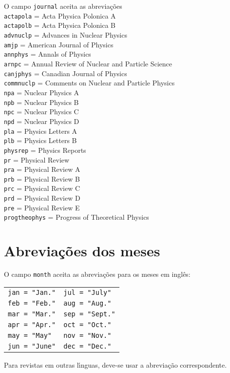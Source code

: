 \documentclass[a4paper,12pt]{article}
\newcommand{\ii}{\'{\i}}
\newcommand{\ca}{\c{c}\~ao}
\newcommand{\co}{\c{c}\~oes}
\newcommand{\identacao}{\\[1mm] \hspace*{3cm}}
\begin{document}
			
			O campo \verb+journal+ aceita as abrevia{\co}
			\identacao
			{\verb+actapola+} = {Acta Physica Polonica A}
			\identacao
			{\verb+actapolb+} = {Acta Physica Polonica B}
			\identacao
			{\verb+advnuclp+} = {Advances in Nuclear Physics}
			\identacao
			{\verb+amjp+} = {American Journal of Physics}
			\identacao
			{\verb+annphys+} = {Annals of Physics}
			\identacao
			{\verb+arnpc+} = {Annual Review of Nuclear and Particle Science}
			\identacao
			{\verb+canjphys+} = {Canadian Journal of Physics}
			\identacao
			{\verb+commnuclp+} = {Comments on Nuclear and Particle Physics}
			\identacao
			{\verb+npa+} = {Nuclear Physics A}
			\identacao
			{\verb+npb+} = {Nuclear Physics B}
			\identacao
			{\verb+npc+} = {Nuclear Physics C}
			\identacao
			{\verb+npd+} = {Nuclear Physics D}
			\identacao
			{\verb+pla+} = {Physics Letters A}
			\identacao
			{\verb+plb+} = {Physics Letters B}
			\identacao
			{\verb+physrep+} = {Physics Reports}
			\identacao
			{\verb+pr+} = {Physical Review}
			\identacao
			{\verb+pra+} = {Physical Review A}
			\identacao
			{\verb+prb+} = {Physical Review B}
			\identacao
			{\verb+prc+} = {Physical Review C}
			\identacao
			{\verb+prd+} = {Physical Review D}
			\identacao
			{\verb+pre+} = {Physical Review E}
			\identacao
			{\verb+progtheophys+} = {Progress of Theoretical Physics}
			\begin{comment}
				\identacao
				{\verb+zfpa+} = {Zeitschrift f\"ur Physik A}
				\identacao
				{\verb+zfpb+} = {Zeitschrift f\"ur Physik B}
				\identacao
				{\verb+zfpc+} = {Zeitschrift f\"ur Physik C}
			\end{comment}
			
			
			
			
			\section{Abrevia{\co} dos meses}
			\label{sec_mes}
			
			
			O campo \verb+month+ aceita as abrevia{\co} para os meses em ingl\^es:
			\begin{center}
				\begin{tabular}{l@{\hspace{1.2cm}}l}
					\verb+jan = "Jan."+  & \verb+jul = "July"+ \\
					\verb+feb = "Feb."+  & \verb+aug = "Aug."+ \\
					\verb+mar = "Mar."+  & \verb+sep = "Sept."+ \\
					\verb+apr = "Apr."+  & \verb+oct = "Oct."+ \\
					\verb+may = "May"+   & \verb+nov = "Nov."+ \\
					\verb+jun = "June"+  & \verb+dec = "Dec."+
				\end{tabular}
			\end{center}
			Para revistas em outras l{\ii}nguas, deve-se usar a abrevia{\ca}
			correspondente. 
			
			
			
			
			
			
			
			
		
\end{document}
